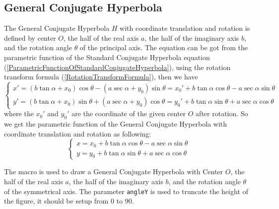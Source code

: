 \documentclass[11pt,english,BCOR=10mm,DIV=12,bibliography=totoc,parskip=false,headings=small,
    headinclude=false,footinclude=false,twoside,english]{pst-doc}
\begin{document}
\subsection{General Conjugate Hyperbola}
The General Conjugate Hyperbola $H$ with coordinate translation and rotation is defined by center $O$,
the half of the real axis $a$, the half of the imaginary axis $b$,
and the rotation angle $\theta$ of the principal axis.
The equation can be got from the parametric function of the Standard Conjugate Hyperbola equation (\ref{ParametricFunctionOfStandardConjugateHyperbola}),
using the rotation transform formula (\ref{RotationTransformFormula}), then we have
\begin{equation}
\left\{\begin{array}{l}
x'=(b\tan\alpha+x_0)\cos\theta-(a\sec\alpha+y_0)\sin\theta=x_0'+b\tan\alpha\cos\theta-a\sec\alpha\sin\theta\\
y'=(b\tan\alpha+x_0)\sin\theta+(a\sec\alpha+y_0)\cos\theta=y_0'+b\tan\alpha\sin\theta+a\sec\alpha\cos\theta
\end{array}\right.
\end{equation}
where the $x_0'$ and $y_0'$ are the coordinate of the given center $O$ after rotation.
So we get the parametric function of the General Conjugate Hyperbola with coordinate translation and rotation as following:
\begin{equation}\label{ParametricFunctionOfGeneralConjugateHyperbola}
\left\{\begin{array}{l}
x=x_0+b\tan\alpha\cos\theta-a\sec\alpha\sin\theta\\
y=y_0+b\tan\alpha\sin\theta+a\sec\alpha\cos\theta
\end{array}\right.
\end{equation}

The macro  is used to draw a General Conjugate Hyperbola with Center $O$,
the half of the real axis $a$, the half of the imaginary axis $b$,
and the rotation angle $\theta$ of the symmetrical axis.
The parameter \texttt{angleY} is used to truncate the height of the figure,
it should be setup from 0 to 90.

\begin{BDef}
\OptArgs{}\OptArg{$\theta$}
\end{BDef}
\end{document}
